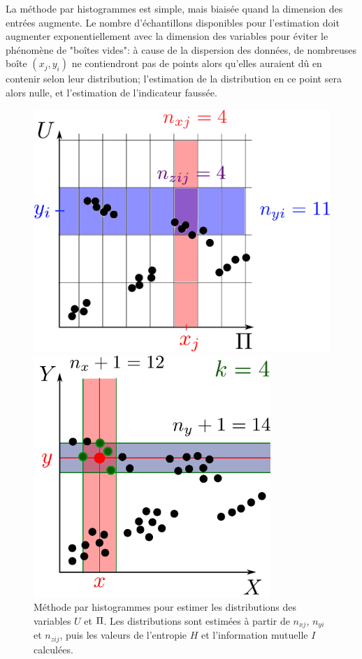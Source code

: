 La méthode par histogrammes est simple, mais biaisée quand la dimension des entrées augmente.
Le nombre d'échantillons disponibles pour l'estimation doit augmenter exponentiellement avec la dimension des variables pour éviter le phénomène de "boîtes vides": à cause de la dispersion des données, de nombreuses boîte $(x_j,y_i)$ ne contiendront pas de points alors qu'elles auraient dû en contenir selon leur distribution; l'estimation de la distribution en ce point sera alors nulle, et l'estimation de l'indicateur faussée.

\begin{figure}
\begin{minipage}{0.4\textwidth}
\centering
\includegraphics[width=\textwidth]{boxes}
\caption{Méthode par histogrammes pour estimer les distributions des variables $U$ et $\Pi$. Les distributions sont estimées à partir de $n_{xj}$, $n_{yi}$ et $n_{zij}$, puis les valeurs de l'entropie $H$ et l'information mutuelle $I$ calculées.}
\label{fig:binning}  
\end{minipage}
\hfill
\begin{minipage}{0.4\textwidth}    
        \centering
        \includegraphics[width=0.8\textwidth]{kraskov.pdf}

\end{minipage}
\end{figure}
